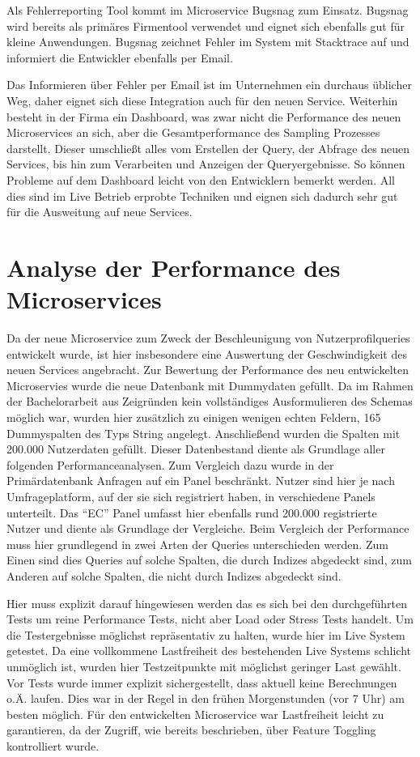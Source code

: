 Als Fehlerreporting Tool kommt im Microservice Bugsnag\cite{bugsnag} zum Einsatz. Bugsnag wird bereits als primäres Firmentool verwendet und eignet sich ebenfalls gut für kleine Anwendungen. Bugsnag zeichnet Fehler im System mit Stacktrace auf und informiert die Entwickler ebenfalls per Email.

Das Informieren über Fehler per Email ist im Unternehmen ein durchaus üblicher Weg, daher eignet sich diese Integration auch für den neuen Service. Weiterhin besteht in der Firma ein Dashboard, was zwar nicht die Performance des neuen Microservices an sich, aber die Gesamtperformance des Sampling Prozesses darstellt. Dieser umschließt alles vom Erstellen der Query, der Abfrage des neuen Services, bis hin zum Verarbeiten und Anzeigen der Queryergebnisse. So können Probleme auf dem Dashboard leicht von den Entwicklern bemerkt werden. All dies sind im Live Betrieb erprobte Techniken und eignen sich dadurch sehr gut für die Ausweitung auf neue Services.

\section{Analyse der Performance des Microservices}
Da der neue Microservice zum Zweck der Beschleunigung von Nutzerprofilqueries entwickelt wurde, ist hier insbesondere eine Auswertung der Geschwindigkeit des neuen Services angebracht. 
Zur Bewertung der Performance des neu entwickelten Microservies wurde die neue Datenbank mit Dummydaten gefüllt. Da im Rahmen der Bachelorarbeit aus Zeigründen kein vollständiges Ausformulieren des Schemas möglich war, wurden hier zusätzlich zu einigen wenigen echten Feldern, 165 Dummyspalten des Typs String angelegt. Anschließend wurden die Spalten mit 200.000 Nutzerdaten gefüllt. Dieser Datenbestand diente als Grundlage aller folgenden Performanceanalysen. Zum Vergleich dazu wurde in der Primärdatenbank Anfragen auf ein Panel beschränkt. Nutzer sind hier je nach Umfrageplatform, auf der sie sich registriert haben, in verschiedene Panels unterteilt. Das ``EC'' Panel umfasst hier ebenfalls rund 200.000 registrierte Nutzer und diente als Grundlage der Vergleiche.
Beim Vergleich der Performance muss hier grundlegend in zwei Arten der Queries unterschieden werden. Zum Einen sind dies Queries auf solche Spalten, die durch Indizes abgedeckt sind, zum Anderen auf solche Spalten, die nicht durch Indizes abgedeckt sind.

Hier muss explizit darauf hingewiesen werden das es sich bei den durchgeführten Tests um reine Performance Tests, nicht aber Load oder Stress Tests handelt.
Um die Testergebnisse möglichst repräsentativ zu halten, wurde hier im Live System getestet.\cite{msdn:perftesting} 
Da eine vollkommene Lastfreiheit des bestehenden Live Systems schlicht unmöglich ist, wurden hier Testzeitpunkte mit möglichst geringer Last gewählt. Vor Tests wurde immer explizit sichergestellt, dass aktuell keine Berechnungen o.Ä. laufen. Dies war in der Regel in den frühen Morgenstunden (vor 7 Uhr) am besten möglich.
Für den entwickelten Microservice war Lastfreiheit leicht zu garantieren, da der Zugriff, wie bereits beschrieben, über Feature Toggling kontrolliert wurde. 


